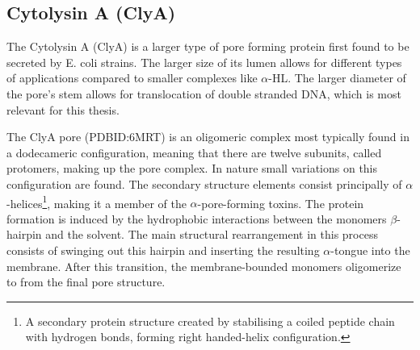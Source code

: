\begin{figure}[ht!]
\begin{centering}
  \caption[Structural overview of the Cytolysin A (ClyA) pore forming
  protein.]{}
  \label{fig:ClyA}

  \end{centering}
\end{figure}

\subsection{Cytolysin A (ClyA)}

The Cytolysin A (ClyA) is a larger type of pore forming protein first found to be
secreted by E. coli strains. \cite{Mueller2009} The larger size of its lumen allows for
different types of applications compared to smaller complexes like $\alpha$-HL. The
larger diameter of the pore's stem allows for translocation of double stranded DNA, which
is most relevant for this thesis.

The ClyA pore (PDBID:6MRT\cite{Peng2019}) is an oligomeric complex most typically found
in a dodecameric configuration,  meaning that there are twelve subunits, called
protomers, making up the pore complex. In nature small variations on this configuration
are found.
The secondary structure elements consist principally of
$\alpha$-helices\footnote{A secondary protein structure created by stabilising a coiled
peptide chain with hydrogen bonds, forming right handed-helix configuration.},
making it a member of the $ \alpha$-pore-forming toxins. The protein formation is induced
by the hydrophobic interactions between the monomers $\beta$-hairpin and the solvent. The
main structural rearrangement in this process consists of swinging out this hairpin and
inserting the resulting $\alpha$-tongue into the membrane. After this transition, the
membrane-bounded monomers oligomerize to from the final pore structure.\cite{Benke2015}

